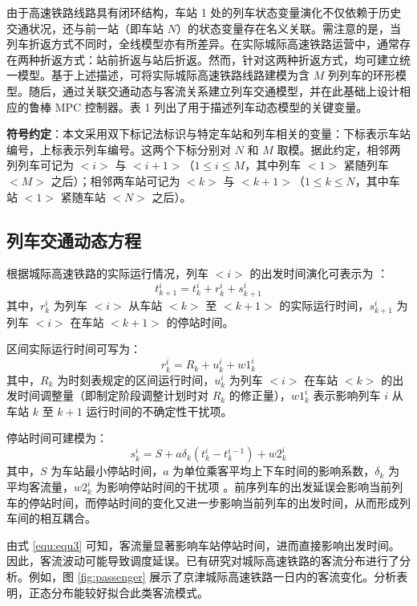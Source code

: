 由于高速铁路线路具有闭环结构，车站 1 处的列车状态变量演化不仅依赖于历史交通状况，还与前一站（即车站 $N$）的状态变量存在名义关联。需注意的是，当列车折返方式不同时，全线模型亦有所差异。在实际城际高速铁路运营中，通常存在两种折返方式：站前折返与站后折返。然而，针对这两种折返方式，均可建立统一模型。基于上述描述，可将实际城际高速铁路线路建模为含 $M$ 列列车的环形模型。随后，通过关联交通动态与客流关系建立列车交通模型，并在此基础上设计相应的鲁棒 MPC 控制器。表 1 列出了用于描述列车动态模型的关键变量。

\textbf{符号约定}：本文采用双下标记法标识与特定车站和列车相关的变量：下标表示车站编号，上标表示列车编号。这两个下标分别对 $N$ 和 $M$ 取模。据此约定，相邻两列列车可记为 $<i>$ 与 $<i+1>$（$1 \leq i \leq M$，其中列车 $<1>$ 紧随列车 $<M>$ 之后）；相邻两车站可记为 $<k>$ 与 $<k+1>$（$1 \leq k \leq N$，其中车站 $<1>$ 紧随车站 $<N>$ 之后）。

\subsection{列车交通动态方程}
\label{2.B}

根据城际高速铁路的实际运行情况，列车 $<i>$ 的出发时间演化可表示为 \citep{b18}：
\begin{equation}
   t_{k+1}^{i}=t_{k}^{i}+r_{k}^{i}+s_{k+1}^{i}
\label{equ:equ1}
\end{equation}
其中，$r_{k}^{i}$ 为列车 $<i>$ 从车站 $<k>$ 至 $<k+1>$ 的实际运行时间，$s_{k+1}^{i}$ 为列车 $<i>$ 在车站 $<k+1>$ 的停站时间。

区间实际运行时间可写为：
\begin{equation}
   r_{k}^{i}=R_{k}+u_{k}^{i}+w1_{k}^{i}
\label{equ:equ2}
\end{equation}
其中，$R_{k}$ 为时刻表规定的区间运行时间，$u_{k}^{i}$ 为列车 $<i>$ 在车站 $<k>$ 的出发时间调整量（即制定阶段调整计划时对 $R_k$ 的修正量），$w1_{k}^{i}$ 表示影响列车 $i$ 从车站 $k$ 至 $k+1$ 运行时间的不确定性干扰项。

停站时间可建模为：
\begin{equation}
    s_{k}^{i}=S+a\delta_{k} (t_{k}^{i}-t_{k}^{i-1})+w2_{k}^{i}
\label{equ:equ3}
\end{equation}
其中，$S$ 为车站最小停站时间，$a$ 为单位乘客平均上下车时间的影响系数，$\delta_{k}$ 为平均客流量，$w2_{k}^{i}$ 为影响停站时间的干扰项 \citep{b17}。前序列车的出发延误会影响当前列车的停站时间，而停站时间的变化又进一步影响当前列车的出发时间，从而形成列车间的相互耦合。

由式 \eqref{equ:equ3} 可知，客流量显著影响车站停站时间，进而直接影响出发时间。因此，客流波动可能导致调度延误。已有研究对城际高速铁路的客流分布进行了分析。例如，图 \ref{fig:passenger} 展示了京津城际高速铁路一日内的客流变化。分析表明，正态分布能较好拟合此类客流模式。

